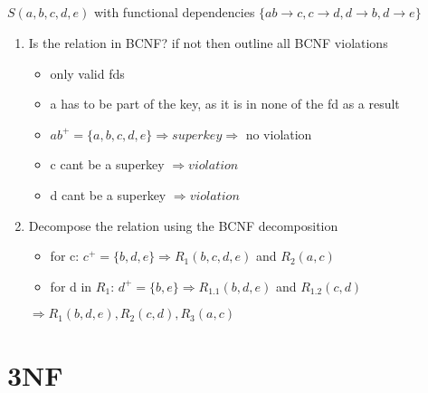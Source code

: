 \documentclass{article}
\begin{document}
\subsection*{} $S(a, b, c, d, e)$ with functional dependencies
    $\{ab \rightarrow c, c \rightarrow d, d \rightarrow b, d \rightarrow e\}$
\begin{enumerate}
    \item Is the relation in BCNF? if not then outline all BCNF violations
        \begin{itemize}
            \item only valid fds
            \item a has to be part of the key, as it is in none of the fd as a result
            \item $ab^{+} = \{a, b, c, d, e\} \Rightarrow superkey \Rightarrow$ no violation
            \item c cant be a superkey $\Rightarrow violation$
            \item d cant be a superkey $\Rightarrow violation$
        \end{itemize}
    \item Decompose the relation using the BCNF decomposition
        \begin{itemize}
            \item for c: $c^{+} = \{b, d, e\} \Rightarrow R_{1}(b, c, d, e)$ and $R_{2}(a, c)$
            \item for d in $R_{1}$: $d^{+} = \{b, e\} \Rightarrow R_{1.1}(b, d, e)$ and $R_{1.2}(c, d)$
        \end{itemize}
    $\Rightarrow R_{1}(b, d, e), R_{2}(c, d), R_{3}(a, c)$
\end{enumerate}

\section{3NF}
\end{document}
